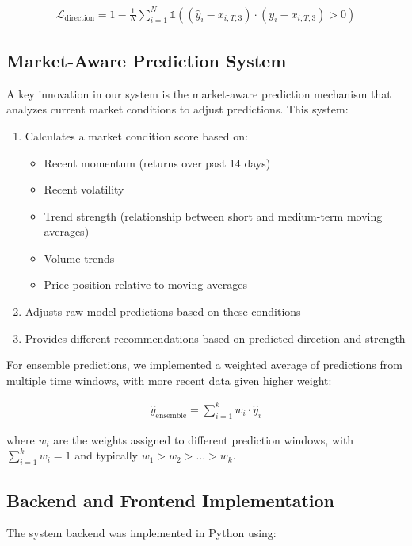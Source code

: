 \documentclass[conference]{IEEEtran}
\begin{document}
\begin{equation}
\begin{aligned}
\mathcal{L}_{\text{direction}} = 1 - \frac{1}{N}\sum_{i=1}^{N} \mathbb{1}((\hat{y}_i - x_{i,T,3}) \cdot (y_i - x_{i,T,3}) > 0)
\end{aligned}
\end{equation}

\subsection{Market-Aware Prediction System}
A key innovation in our system is the market-aware prediction mechanism that analyzes current market conditions to adjust predictions. This system:

\begin{enumerate}
\item Calculates a market condition score based on:
   \begin{itemize}
   \item Recent momentum (returns over past 14 days)
   \item Recent volatility
   \item Trend strength (relationship between short and medium-term moving averages)
   \item Volume trends
   \item Price position relative to moving averages
   \end{itemize}
\item Adjusts raw model predictions based on these conditions
\item Provides different recommendations based on predicted direction and strength
\end{enumerate}

For ensemble predictions, we implemented a weighted average of predictions from multiple time windows, with more recent data given higher weight:

\begin{equation}
\begin{aligned}
\hat{y}_{\text{ensemble}} = \sum_{i=1}^{k} w_i \cdot \hat{y}_i
\end{aligned}
\end{equation}

where $w_i$ are the weights assigned to different prediction windows, with $\sum_{i=1}^{k} w_i = 1$ and typically $w_1 > w_2 > ... > w_k$.

\subsection{Backend and Frontend Implementation}
The system backend was implemented in Python using:
\end{document}
